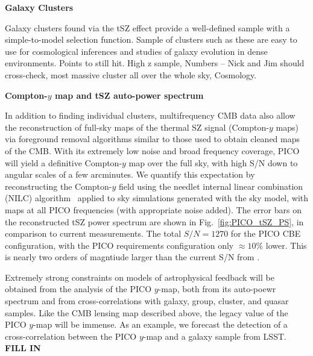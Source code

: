 \documentclass[PICOReport.tex]{subfiles}
\begin{document}
{\bf Galaxy Clusters}


Galaxy clusters found via the tSZ  effect provide a well-defined sample with a simple-to-model selection function. Sample of clusters such as these are easy to use for cosmological inferences and studies of galaxy evolution in dense environments. 
Points to still hit.
High z sample,
Numbers -- Nick and Jim should cross-check,
most massive cluster all over the whole sky,
Cosmology.

{\bf Compton-$y$ map and tSZ auto-power spectrum}

In addition to finding individual clusters, multifrequency CMB data also allow the reconstruction of full-sky maps of the thermal SZ signal (Compton-$y$ maps) via foreground removal algorithms similar to those used to obtain cleaned maps of the CMB.  With its extremely low noise and broad frequency coverage, PICO will yield a definitive Compton-$y$ map over the full sky, with high S/N down to angular scales of a few arcminutes.  We quantify this expectation by reconstructing the Compton-$y$ field using the needlet internal linear combination (NILC) algorithm~\cite{Delabrouille2009} applied to sky simulations generated with the \planck sky model, with maps at all PICO frequencies (with appropriate noise added).  The error bars on the reconstructed tSZ power spectrum are shown in Fig.~\ref{fig:PICO_tSZ_PS}, in comparison to current measurements.  The total $S/N = 1270$ for the PICO CBE configuration, with the PICO requirements configuration only $\approx 10$\% lower.  This is nearly two orders of magntiude larger than the current S/N from \planck.

Extremely strong constraints on models of astrophysical feedback will be obtained from the analysis of the PICO $y$-map, both from its auto-poewr spectrum and from cross-correlations with galaxy, group, cluster, and quasar samples.  Like the CMB lensing map described above, the legacy value of the PICO $y$-map will be immense.  As an example, we forecast the detection of a cross-correlation between the PICO $y$-map and a galaxy sample from LSST.  \textbf{FILL IN}
\end{document}
